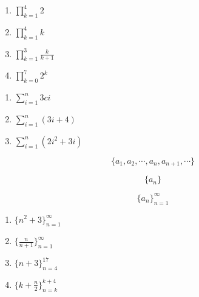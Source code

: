 \documentclass[twocolumn]{article}
\begin{document}
\begin{enumerate}
    \item $ \prod_{k=1}^{4} 2 $

    \item $ \prod_{k=1}^{4} k $
    
    \item $ \prod_{k=1}^{3} \frac{k}{k+1} $

    \item $ \prod_{k=0}^{7} 2^k $
\end{enumerate}


\begin{enumerate}
    \item $ \sum_{i=1}^{n} 3ci $

    \item $ \sum_{i=1}^{n} (3i + 4) $

    \item $ \sum_{i=1}^{n} (2i^2 + 3i) $
\end{enumerate}

$$ \{a_1, a_2, \cdots, a_n, a_{n+1}, \cdots \} $$

$$ \{ a_n \} $$

$$ \{ a_n \}_{n=1}^{\infty} $$

\begin{enumerate}
    \item $ \{ n^2 + 3 \}_{n=1}^{\infty} $
    \item $ \{ \frac{n}{n+1} \}_{n=1}^{\infty} $
    \item $ \{ n + 3 \}_{n=4}^{17} $
    \item $ \{ k + \frac{n}{2} \}_{n=k}^{k+4} $
\end{enumerate}
\fi
\end{document}
